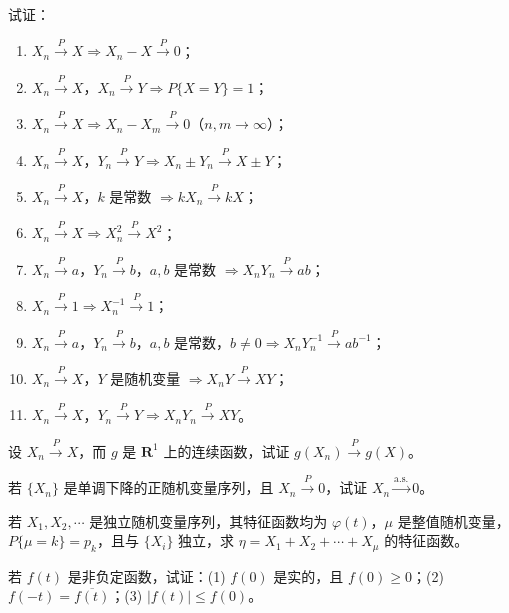 \documentclass[../../main.tex]{subfiles}
\begin{document}
\begin{exercise}\label{exercise:ch05-26}
试证：
\begin{enumerate}
\item $X_n\xrightarrow{P}X\Rightarrow X_n-X\xrightarrow{P}0$；
\item $X_n\xrightarrow{P}X$，$X_n\xrightarrow{P}Y\Rightarrow P\{X=Y\}=1$；
\item $X_n\xrightarrow{P}X\Rightarrow X_n-X_m\xrightarrow{P}0$（$n,m\to\infty$）；
\item $X_n\xrightarrow{P}X$，$Y_n\xrightarrow{P}Y\Rightarrow X_n\pm Y_n\xrightarrow{P}X\pm Y$；
\item $X_n\xrightarrow{P}X$，$k$ 是常数 $\Rightarrow kX_n\xrightarrow{P}kX$；
\item $X_n\xrightarrow{P}X\Rightarrow X_n^{2}\xrightarrow{P}X^{2}$；
\item $X_n\xrightarrow{P}a$，$Y_n\xrightarrow{P}b$，$a,b$ 是常数 $\Rightarrow X_nY_n\xrightarrow{P}ab$；
\item $X_n\xrightarrow{P}1\Rightarrow X_n^{-1}\xrightarrow{P}1$；
\item $X_n\xrightarrow{P}a$，$Y_n\xrightarrow{P}b$，$a,b$ 是常数，$b\neq0\Rightarrow X_nY_n^{-1}\xrightarrow{P}ab^{-1}$；
\item $X_n\xrightarrow{P}X$，$Y$ 是随机变量 $\Rightarrow X_nY\xrightarrow{P}XY$；
\item $X_n\xrightarrow{P}X$，$Y_n\xrightarrow{P}Y\Rightarrow X_nY_n\xrightarrow{P}XY$。
\end{enumerate}
\end{exercise}

\begin{exercise}\label{exercise:ch05-27}
设 $X_n\xrightarrow{P}X$，而 $g$ 是 $\mathbf{R}^{1}$ 上的连续函数，试证 $g(X_n)\xrightarrow{P}g(X)$。
\end{exercise}

\begin{exercise}\label{exercise:ch05-28}
若 $\{X_n\}$ 是单调下降的正随机变量序列，且 $X_n\xrightarrow{P}0$，试证 $X_n\xrightarrow{\mathrm{a.s.}}0$。
\end{exercise}

\begin{exercise}\label{exercise:ch05-29}
若 $X_1,X_2,\cdots$ 是独立随机变量序列，其特征函数均为 $\varphi(t)$，$\mu$ 是整值随机变量，$P\{\mu=k\}=p_k$，且与 $\{X_i\}$ 独立，求 $\eta=X_1+X_2+\cdots+X_{\mu}$ 的特征函数。
\end{exercise}

\begin{exercise}\label{exercise:ch05-30}
若 $f(t)$ 是非负定函数，试证：(1) $f(0)$ 是实的，且 $f(0)\geqslant0$；(2) $f(-t)=\overline{f(t)}$；(3) $|f(t)|\leqslant f(0)$。
\end{exercise}
\end{document}
